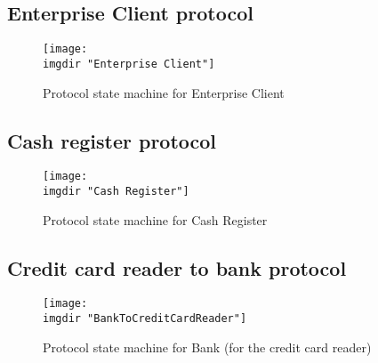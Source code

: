 \subsection{Enterprise Client protocol}
\begin{figure}
  \centering
  \texttt{[image: \\imgdir "Enterprise Client"]}
  \caption{Protocol state machine for Enterprise Client}
  \label{fig:lsm:enterprise_client}
\end{figure}

\subsection{Cash register protocol}
\begin{figure}
  \centering
  \texttt{[image: \\imgdir "Cash Register"]}
  \caption{Protocol state machine for Cash Register}
  \label{fig:lsm:cash_register}
\end{figure}

\subsection{Credit card reader to bank protocol}
\begin{figure}
  \centering
  \texttt{[image: \\imgdir "BankToCreditCardReader"]}
  \caption{Protocol state machine for Bank (for the credit card reader)}
  \label{fig:lsm:ccr_to_bank}
\end{figure}
